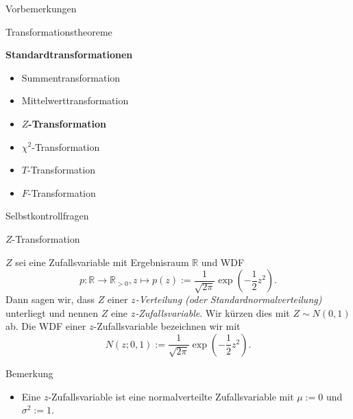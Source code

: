 \documentclass[
  8pt,
  ignorenonframetext,
]{beamer}
\providecommand{\tightlist}{%
  \setlength{\itemsep}{0pt}\setlength{\parskip}{0pt}}
\begin{document}
\begin{frame}{}
\protect\hypertarget{section-8}{}
\large

Vorbemerkungen

Transformationstheoreme

\textbf{Standardtransformationen}

\normalsize

\begin{itemize}
\tightlist
\item
  Summentransformation
\item
  Mittelwerttransformation
\item
  \textbf{\(Z\)-Transformation}
\item
  \(\chi^2\)-Transformation
\item
  \(T\)-Transformation
\item
  \(F\)-Transformation
\end{itemize}

\large

Selbstkontrollfragen
\end{frame}

\begin{frame}{\(Z\)-Transformation}
\protect\hypertarget{z-transformation}{}
\small
\begin{definition}[$z$-Zufallsvariable]
\justifying
$Z$ sei eine Zufallsvariable mit Ergebnisraum  $\mathbb{R}$ und WDF
\begin{equation}
p : \mathbb{R} \to \mathbb{R}_{>0}, z \mapsto p(z) := \frac{1}{\sqrt{2\pi}}\exp\left(-\frac{1}{2}z^2\right).
\end{equation}
Dann sagen wir, dass $Z$ einer \textit{$z$-Verteilung (oder Standardnormalverteilung)}
unterliegt und nennen $Z$ eine \textit{$z$-Zufallsvariable}. Wir kürzen dies mit
$Z \sim N(0,1)$ ab. Die WDF einer $z$-Zufallsvariable bezeichnen wir mit
\begin{equation}
N(z;0,1) := \frac{1}{\sqrt{2\pi}}\exp\left(-\frac{1}{2}z^2\right).
\end{equation}
\end{definition}

Bemerkung

\begin{itemize}
\tightlist
\item
  Eine \(z\)-Zufallsvariable ist eine normalverteilte Zufallsvariable
  mit \(\mu := 0\) und \(\sigma^2 := 1\).
\end{itemize}
\end{frame}
\end{document}
